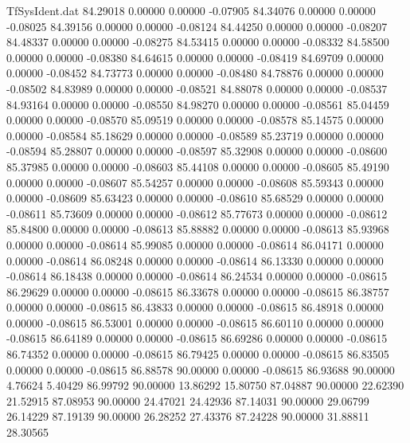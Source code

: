 \begin{filecontents}{TfSysIdent.dat}
  84.29018    0.00000    0.00000   -0.07905
  84.34076    0.00000    0.00000   -0.08025
  84.39156    0.00000    0.00000   -0.08124
  84.44250    0.00000    0.00000   -0.08207
  84.48337    0.00000    0.00000   -0.08275
  84.53415    0.00000    0.00000   -0.08332
  84.58500    0.00000    0.00000   -0.08380
  84.64615    0.00000    0.00000   -0.08419
  84.69709    0.00000    0.00000   -0.08452
  84.73773    0.00000    0.00000   -0.08480
  84.78876    0.00000    0.00000   -0.08502
  84.83989    0.00000    0.00000   -0.08521
  84.88078    0.00000    0.00000   -0.08537
  84.93164    0.00000    0.00000   -0.08550
  84.98270    0.00000    0.00000   -0.08561
  85.04459    0.00000    0.00000   -0.08570
  85.09519    0.00000    0.00000   -0.08578
  85.14575    0.00000    0.00000   -0.08584
  85.18629    0.00000    0.00000   -0.08589
  85.23719    0.00000    0.00000   -0.08594
  85.28807    0.00000    0.00000   -0.08597
  85.32908    0.00000    0.00000   -0.08600
  85.37985    0.00000    0.00000   -0.08603
  85.44108    0.00000    0.00000   -0.08605
  85.49190    0.00000    0.00000   -0.08607
  85.54257    0.00000    0.00000   -0.08608
  85.59343    0.00000    0.00000   -0.08609
  85.63423    0.00000    0.00000   -0.08610
  85.68529    0.00000    0.00000   -0.08611
  85.73609    0.00000    0.00000   -0.08612
  85.77673    0.00000    0.00000   -0.08612
  85.84800    0.00000    0.00000   -0.08613
  85.88882    0.00000    0.00000   -0.08613
  85.93968    0.00000    0.00000   -0.08614
  85.99085    0.00000    0.00000   -0.08614
  86.04171    0.00000    0.00000   -0.08614
  86.08248    0.00000    0.00000   -0.08614
  86.13330    0.00000    0.00000   -0.08614
  86.18438    0.00000    0.00000   -0.08614
  86.24534    0.00000    0.00000   -0.08615
  86.29629    0.00000    0.00000   -0.08615
  86.33678    0.00000    0.00000   -0.08615
  86.38757    0.00000    0.00000   -0.08615
  86.43833    0.00000    0.00000   -0.08615
  86.48918    0.00000    0.00000   -0.08615
  86.53001    0.00000    0.00000   -0.08615
  86.60110    0.00000    0.00000   -0.08615
  86.64189    0.00000    0.00000   -0.08615
  86.69286    0.00000    0.00000   -0.08615
  86.74352    0.00000    0.00000   -0.08615
  86.79425    0.00000    0.00000   -0.08615
  86.83505    0.00000    0.00000   -0.08615
  86.88578   90.00000    0.00000   -0.08615
  86.93688   90.00000    4.76624    5.40429
  86.99792   90.00000   13.86292   15.80750
  87.04887   90.00000   22.62390   21.52915
  87.08953   90.00000   24.47021   24.42936
  87.14031   90.00000   29.06799   26.14229
  87.19139   90.00000   26.28252   27.43376
  87.24228   90.00000   31.88811   28.30565

\end{filecontents}
